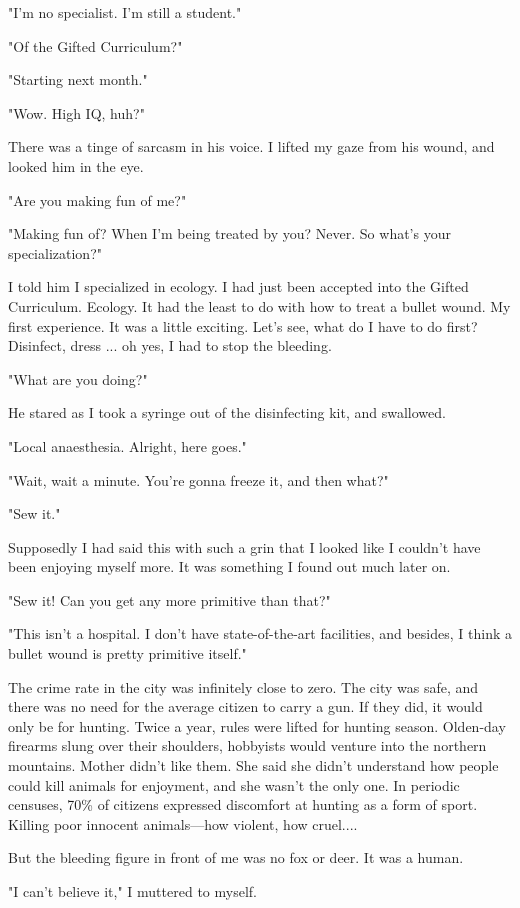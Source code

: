 "I'm no specialist. I'm still a student."

"Of the Gifted Curriculum?"

"Starting next month."

"Wow. High IQ, huh?"

There was a tinge of sarcasm in his voice. I lifted my gaze from his
wound, and looked him in the eye.

"Are you making fun of me?"

"Making fun of? When I'm being treated by you? Never. So what's your
specialization?"

I told him I specialized in ecology. I had just been accepted into the
Gifted Curriculum. Ecology. It had the least to do with how to treat a
bullet wound. My first experience. It was a little exciting. Let's see,
what do I have to do first? Disinfect, dress ... oh yes, I had to stop
the bleeding.

"What are you doing?"

He stared as I took a syringe out of the disinfecting kit, and
swallowed.

"Local anaesthesia. Alright, here goes."

"Wait, wait a minute. You're gonna freeze it, and then what?"

"Sew it."

Supposedly I had said this with such a grin that I looked like I
couldn't have been enjoying myself more. It was something I found out
much later on.

"Sew it! Can you get any more primitive than that?"

"This isn't a hospital. I don't have state-of-the-art facilities, and
besides, I think a bullet wound is pretty primitive itself."

The crime rate in the city was infinitely close to zero. The city was
safe, and there was no need for the average citizen to carry a gun. If
they did, it would only be for hunting. Twice a year, rules were lifted
for hunting season. Olden-day firearms slung over their shoulders,
hobbyists would venture into the northern mountains. Mother didn't like
them. She said she didn't understand how people could kill animals for
enjoyment, and she wasn't the only one. In periodic censuses, 70\% of
citizens expressed discomfort at hunting as a form of sport. Killing
poor innocent animals---how violent, how cruel....

But the bleeding figure in front of me was no fox or deer. It was a
human.

"I can't believe it," I muttered to myself.

